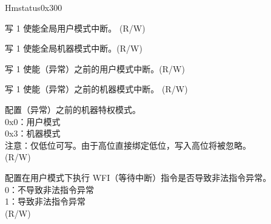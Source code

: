 \begin{register}{H}{mstatus}{0x300}\label{regdesc:MSTATUS}
%
%
%
%
%
%
%
%
%
%
%
\regnewline%
\begin{regdesc}\begin{reglist}
\label{fielddesc:MSTATUSUIE}\item [UIE] 写 1 使能全局用户模式中断。 (R/W)
\label{fielddesc:MSTATUSMIE}\item [MIE] 写 1 使能全局机器模式中断。(R/W)
\label{fielddesc:MSTATUSUPIE}\item [UPIE] 写 1 使能（异常）之前的用户模式中断。(R/W)
\label{fielddesc:MSTATUSMPIE}\item [MPIE] 写 1 使能（异常）之前的机器模式中断。 (R/W)
\label{fielddesc:MSTATUSMPP}\item [MPP] 配置（异常）之前的机器特权模式。\\
0x0：用户模式\\
0x3：机器模式\\
注意：仅低位可写。由于高位直接绑定低位，写入高位将被忽略。\\
(R/W)
\label{fielddesc:MSTATUSTW}\item [TW] 配置在用户模式下执行 WFI（等待中断）指令是否导致非法指令异常。\\
0：不导致非法指令异常\\
1：导致非法指令异常\\
(R/W)
\end{reglist}\end{regdesc}
\end{register}

